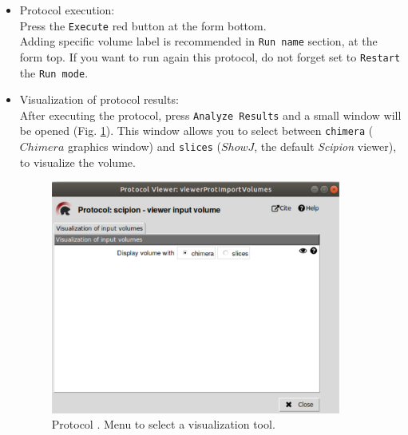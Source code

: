 \documentclass[12pt]{article} %
\newcommand{\ffigure}[1]{{Fig. {\ref{#1}}}\xspace}
\newcommand{\scommand}[1]{{{\keys{#1}}}\xspace}
\def\scipion{\textit{Scipion}\xspace}
\newcommand{\ttt}[1]{\texttt{#1}}
\begin{document}
\begin{appendices}
\begin{itemize}
\begin{itemize}
  \item \ttt{Streaming} section\\
  
  Go to this section if you plan simultaneous data acquisition and processing, and select the option ``Yes''. By default, \scipion considers that you run your processes once you have finished data acquisition (option ``No'').\\
  
  \end{itemize}
  \item Protocol execution:\\
  
  Press the \ttt{Execute} red button at the form bottom.\\
  Adding specific volume label is recommended in \ttt{Run name} section, at the form top. If you want to run again this protocol, do not forget set to \ttt{Restart} the \ttt{Run mode}.\\
  
  \item Visualization of protocol results:\\
  
  After executing the protocol, press \ttt{Analyze Results} and a small window will be opened (\ffigure{fig:app_protocol_volume_2}). This window allows you to select between \ttt{chimera} ($Chimera$ graphics window) and \ttt{slices} ($ShowJ$, the default \scipion viewer), to visualize the volume.
  
  \begin{figure}[H]
    \centering 
    \captionsetup{width=.7\linewidth} 
    \includegraphics[width=0.90\textwidth]{Images_appendix/Fig101.png}
    \caption{Protocol \scommand{import volumes}. Menu to select a visualization tool.}
    \label{fig:app_protocol_volume_2}
   \end{figure}
   

\end{itemize}
\end{appendices}
\end{document}
